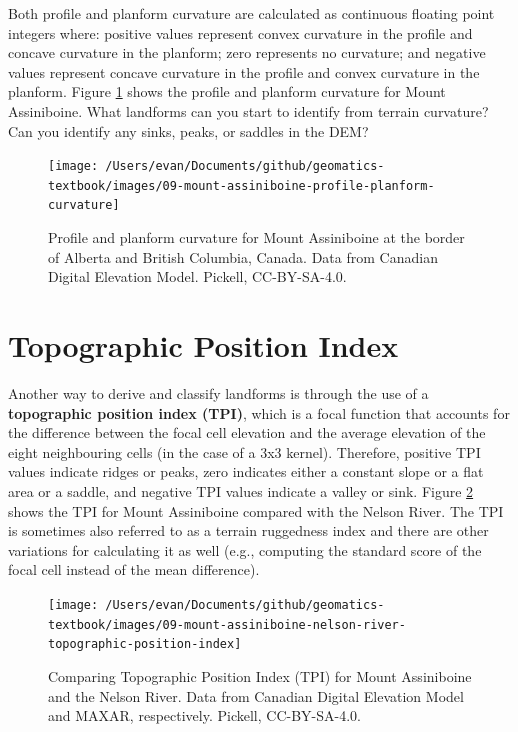 \documentclass[
]{book}
\begin{document}
Both profile and planform curvature are calculated as continuous floating point integers where: positive values represent convex curvature in the profile and concave curvature in the planform; zero represents no curvature; and negative values represent concave curvature in the profile and convex curvature in the planform. Figure \ref{fig:9-mount-assiniboine-profile-planform-curvature} shows the profile and planform curvature for Mount Assiniboine. What landforms can you start to identify from terrain curvature? Can you identify any sinks, peaks, or saddles in the DEM?

\begin{figure}
\texttt{[image: /Users/evan/Documents/github/geomatics-textbook/images/09-mount-assiniboine-profile-planform-curvature]} \caption{Profile and planform curvature for Mount Assiniboine at the border of Alberta and British Columbia, Canada. Data from Canadian Digital Elevation Model. Pickell, CC-BY-SA-4.0.}\label{fig:9-mount-assiniboine-profile-planform-curvature}
\end{figure}

\hypertarget{topographic-position-index}{%
\section{Topographic Position Index}\label{topographic-position-index}}

Another way to derive and classify landforms is through the use of a \textbf{topographic position index (TPI)}, which is a focal function that accounts for the difference between the focal cell elevation and the average elevation of the eight neighbouring cells (in the case of a 3x3 kernel). Therefore, positive TPI values indicate ridges or peaks, zero indicates either a constant slope or a flat area or a saddle, and negative TPI values indicate a valley or sink. Figure \ref{fig:9-mount-assiniboine-nelson-river-topographic-position-index} shows the TPI for Mount Assiniboine compared with the Nelson River. The TPI is sometimes also referred to as a terrain ruggedness index and there are other variations for calculating it as well (e.g., computing the standard score of the focal cell instead of the mean difference).

\begin{figure}
\texttt{[image: /Users/evan/Documents/github/geomatics-textbook/images/09-mount-assiniboine-nelson-river-topographic-position-index]} \caption{Comparing Topographic Position Index (TPI) for Mount Assiniboine and the Nelson River. Data from Canadian Digital Elevation Model and MAXAR, respectively. Pickell, CC-BY-SA-4.0.}\label{fig:9-mount-assiniboine-nelson-river-topographic-position-index}
\end{figure}
\end{document}
